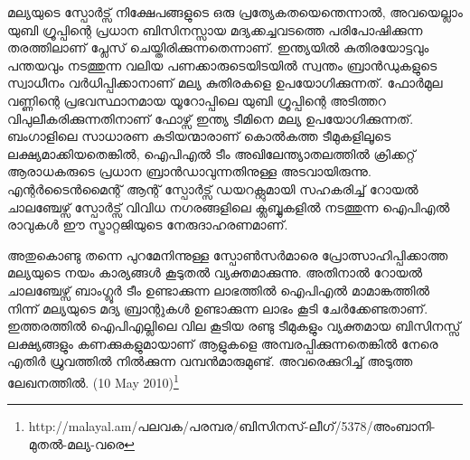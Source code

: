 മല്യയുടെ സ്പോര്‍ട്സ് നിക്ഷേപങ്ങളുടെ ഒരു പ്രത്യേകതയെന്തെന്നാല്‍, അവയെല്ലാം യുബി ഗ്രൂപ്പിന്റെ പ്രധാന ബിസിനസ്സായ 
മദ്യക്കച്ചവടത്തെ പരിപോഷിക്കുന്ന തരത്തിലാണ് പ്ലേസ് ചെയ്തിരിക്കുന്നതെന്നാണ്. ഇന്ത്യയില്‍ കുതിരയോട്ടവും പന്തയവും 
നടത്തുന്ന വലിയ പണക്കാരുടെയിടയില്‍ സ്വന്തം ബ്രാന്‍ഡുകളുടെ സ്വാധീനം വര്‍ധിപ്പിക്കാനാണ് മല്യ കുതിരകളെ 
ഉപയോഗിക്കുന്നത്. ഫോര്‍മുല വണ്ണിന്റെ പ്രഭവസ്ഥാനമായ യൂറോപ്പിലെ യുബി ഗ്രൂപ്പിന്റെ അടിത്തറ വിപുലീകരിക്കുന്നതിനാണ് 
ഫോഴ്സ് ഇന്ത്യ ടീമിനെ മല്യ ഉപയോഗിക്കുന്നത്. ബംഗാളിലെ സാധാരണ കുടിയന്മാരാണ് കൊല്‍കത്ത ടീമുകളിലൂടെ 
ലക്ഷ്യമാക്കിയതെങ്കില്‍, ഐപിഎല്‍ ടീം അഖിലേന്ത്യാതലത്തില്‍ ക്രിക്കറ്റ് ആരാധകരുടെ പ്രധാന ബ്രാന്‍ഡാവുന്നതിനുള്ള 
അടവായിരുന്നു. എന്റര്‍ടൈന്‍മൈന്റ് ആന്റ് സ്പോര്‍ട്സ് ഡയറക്റ്റുമായി സഹകരിച്ച് റോയല്‍ ചാലഞ്ചേഴ്സ് സ്പോര്‍ട്സ് 
വിവിധ നഗരങ്ങളിലെ ക്ലബ്ബുകളില്‍ നടത്തുന്ന ഐപിഎല്‍ രാവുകള്‍ ഈ സ്ട്രാറ്റജിയുടെ നേരുദാഹരണമാണ്.

അതുകൊണ്ടു തന്നെ പുറമേനിന്നുള്ള സ്പോണ്‍സര്‍മാരെ പ്രോത്സാഹിപ്പിക്കാത്ത മല്യയുടെ നയം കാര്യങ്ങള്‍ കൂടുതല്‍ 
വ്യക്തമാക്കുന്നു. അതിനാല്‍ റോയല്‍ ചാലഞ്ചേഴ്സ് ബാംഗ്ലൂര്‍ ടീം ഉണ്ടാക്കുന്ന ലാഭത്തില്‍ ഐപിഎല്‍ മാമാങ്കത്തില്‍ 
നിന്ന് മല്യയുടെ മദ്യ ബ്രാന്റുകള്‍ ഉണ്ടാക്കുന്ന ലാഭം കൂടി ചേര്‍ക്കേണ്ടതാണ്. ഇത്തരത്തില്‍ ഐപിഎല്ലിലെ വില കൂടിയ 
രണ്ടു ടീമുകളും വ്യക്തമായ ബിസിനസ്സ് ലക്ഷ്യങ്ങളും കണക്കുകളുമായാണ് ആളുകളെ അമ്പരപ്പിക്കുന്നതെങ്കില്‍ നേരെ 
എതിര്‍ ധ്രുവത്തില്‍ നില്‍ക്കുന്ന വമ്പന്‍മാരുമുണ്ട്. അവരെക്കുറിച്ച് അടുത്ത ലേഖനത്തില്‍.
(10 May 2010)\footnote{http://malayal.am/പലവക/പരമ്പര/ബിസിനസ്-ലീഗ്/5378/അംബാനി-മുതല്‍-മല്യ-വരെ}

\newpage
